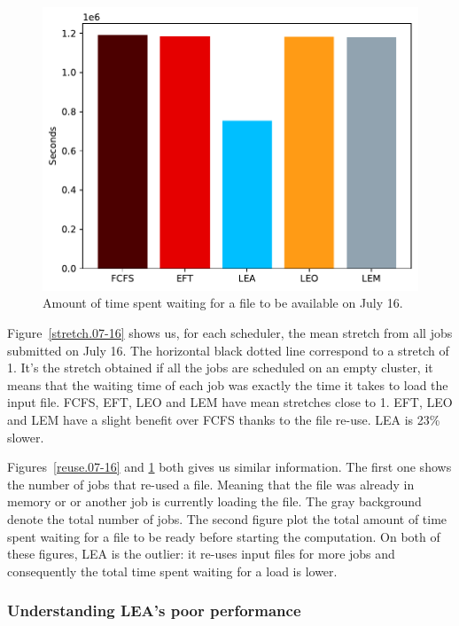 \documentclass[conference,10pt]{IEEEtran}
\begin{document}
\begin{figure}[tb]\centering\includegraphics[scale=0.41]{../MBSS/plot/Results_FCFS_Score_Backfill_2022-07-16->2022-07-16_V10000_Total_waiting_for_a_load_time_and_transfer_time_450_128_32_256_4_1024.pdf}\caption{Amount of time spent waiting for a file to be available on July 16.}\label{load.07-16}\end{figure}

Figure~\ref{stretch.07-16} shows us, for each scheduler, the mean stretch from all jobs
submitted on July 16.
The horizontal black dotted line correspond to a stretch of 1.
It's the stretch obtained if all the jobs 
are scheduled on an empty cluster, it means that the waiting time of each job was exactly
the time it takes to load the input file.
FCFS, EFT, LEO and LEM have mean stretches close to 1.
EFT, LEO and LEM have a slight benefit over FCFS thanks to the file re-use.
LEA is 23\% slower.

Figures~\ref{reuse.07-16} and \ref{load.07-16}
both gives us similar information. The first one 
shows the number of jobs that re-used a file.
Meaning that the file was already in memory or 
or another job is currently loading the file.
The gray background denote the total
number of jobs.
The second figure plot the total amount of time spent 
waiting for a file to be ready before starting the computation.
On both of these figures, LEA is the outlier:
it re-uses input files for more jobs and consequently the total time spent waiting for a load is lower.

\subsubsection{Understanding LEA's poor performance}
\end{document}
